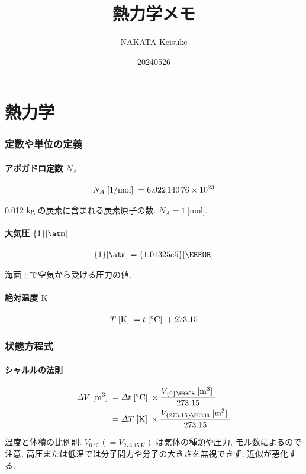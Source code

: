 \documentclass[a4paper,11pt]{jsarticle}
\newcommand{\braunit}[1]{\;\text{[}\unit[per-mode = symbol]{#1}\text{]}\;}
\begin{document}
\title{熱力学メモ}
\author{NAKATA Keisuke}
\date{20240526}
\maketitle


\part*{熱力学}

\section{定数や単位の定義}

\subsection{アボガドロ定数 \texorpdfstring{$N_A$}{N\_A}}
\begin{align*}
  N_A \braunit{\per\mol}= \num{6.02214076e23}
\end{align*}
\par 0.012 kg の炭素に含まれる炭素原子の数. $N_A = \qty{1}{[\mol]}$.
\cite[pp.1]{thermo}

\subsection{大気圧 \texorpdfstring{$\qty{1}{[\atm]}$}{1[atm]}}
\begin{align*}
  \qty{1}{[\atm]} = \qty{1.01325e5}{[\Pa]}
\end{align*}
\par 海面上で空気から受ける圧力の値.
\cite[pp.1]{thermo}

\subsection{絶対温度 \texorpdfstring{$\unit{\K}$}{K}}
\begin{align*}
  T \braunit{\K} = t \braunit{\celsius} + 273.15
\end{align*}
\par \cite[pp.10]{thermo}

\section{状態方程式}

\subsection{シャルルの法則}
\begin{align*}
  \varDelta V\braunit{\m^3}
    &= \varDelta t\braunit{\celsius}\times\frac{V_{\qty{0}{\celsius}}\braunit{\m^3}}{273.15} \\
    &= \varDelta T\braunit{\K}\times\frac{V_{\qty{273.15}{\K}}\braunit{\m^3}}{273.15}
\end{align*}
\par 温度と体積の比例則. $V_{\qty{0}{\celsius}} (=V_{\qty{273.15}{\K}})$ は気体の種類や圧力, モル数によるので注意. 高圧または低温では分子間力や分子の大きさを無視できず, 近似が悪化する.
\cite[pp.10]{thermo}
\end{document}
